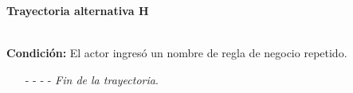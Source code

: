 \hypertarget{CU8-2:TAH}{\textbf{Trayectoria alternativa H}}\\
\noindent \textbf{Condición:} El actor ingresó un nombre de regla de negocio repetido.
\begin{enumerate}
	\UCpaso[\UCsist] Muestra el mensaje  señalando el campo que presenta la duplicidad en la pantalla .
	\UCpaso Regresa al paso \ref{CU8.2-P5} de la trayectoria principal.
	\item[- -] - - {\em {Fin de la trayectoria}}.
\end{enumerate}
